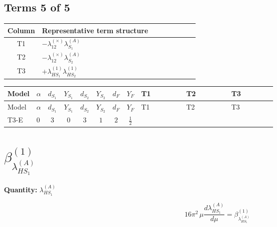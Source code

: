 \documentclass[8pt]{article}
\begin{document}
\begin{landscape}
\subsection*{Terms 5 of 5}
\begin{center}
\begin{tabular}{@{}c >{\raggedright\arraybackslash}p{0.82\linewidth}@{}}
\toprule
Column & Representative term structure \\
\midrule
T1 & \(\displaystyle -{\lambda_{12}^{(\times)}} {\lambda_{S_1}^{(A)}}\) \\
\midrule
T2 & \(\displaystyle -{\lambda_{12}^{(\times)}} {\lambda_{S_2}^{(A)}}\) \\
\midrule
T3 & \(\displaystyle +{\lambda_{HS_1}^{(1)}} {\lambda_{HS_2}^{(1)}}\) \\
\midrule
\bottomrule
\end{tabular}
\end{center}
\smallskip
\tiny
\begin{longtable}{@{}llcccccc >{\raggedright\arraybackslash}p{0.21\linewidth} >{\raggedright\arraybackslash}p{0.21\linewidth} >{\raggedright\arraybackslash}p{0.21\linewidth}@{}}
\toprule
Model & $\alpha$ & $d_{S_1}$ & $Y_{S_1}$ & $d_{S_2}$ & $Y_{S_2}$ & $d_F$ & $Y_F$ & T1 & T2 & T3 \\
\midrule
\endfirsthead
\toprule
Model & $\alpha$ & $d_{S_1}$ & $Y_{S_1}$ & $d_{S_2}$ & $Y_{S_2}$ & $d_F$ & $Y_F$ & T1 & T2 & T3 \\
\midrule
\endhead
T3-E & $0$ & $3$ & $0$ & $3$ & $1$ & $2$ & $\frac{1}{2}$ & \scriptsize\adjustbox{max width=\linewidth}{$\begin{gathered} -{\lambda_{12}^{(\times)}} {\lambda_{S_1}^{(A)}}\end{gathered}$} & \scriptsize\adjustbox{max width=\linewidth}{$\begin{gathered} -{\lambda_{12}^{(\times)}} {\lambda_{S_2}^{(A)}}\end{gathered}$} & \scriptsize\adjustbox{max width=\linewidth}{$\begin{gathered} +{\lambda_{HS_1}^{(1)}} {\lambda_{HS_2}^{(1)}}\end{gathered}$} \\
\midrule
\bottomrule
\end{longtable}
\clearpage
\section*{$\beta_{\lambda_{HS_1}^{(A)}}^{(1)}$}
\noindent\textbf{Quantity: }$\lambda_{HS_1}^{(A)}$\par\smallskip
\[16\pi^2\,\mu\frac{d \lambda_{HS_1}^{(A)}}{d\mu}=\beta_{\lambda_{HS_1}^{(A)}}^{(1)}\]

\end{landscape}
\end{document}
